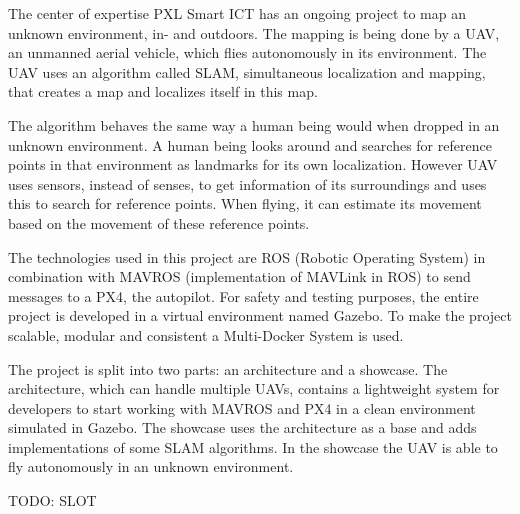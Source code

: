 The center of expertise PXL Smart ICT has an ongoing project to map an unknown environment, in- and outdoors. The mapping is being done by a UAV, an unmanned aerial vehicle, which flies autonomously in its environment. The UAV uses an algorithm called SLAM, simultaneous localization and mapping, that creates a map and localizes itself in this map.

The algorithm behaves the same way a human being would when dropped in an unknown environment. A human being looks around and searches for reference points in that environment as landmarks for its own localization. However UAV uses sensors, instead of senses, to get information of its surroundings and uses this to search for reference points. When flying, it can estimate its movement based on the movement of these reference points.

The technologies used in this project are ROS (Robotic Operating System) in combination with MAVROS (implementation of MAVLink in ROS) to send messages to a PX4, the autopilot. For safety and testing purposes, the entire project is developed in a virtual environment named Gazebo. To make the project scalable, modular and consistent a Multi-Docker System is used.

The project is split into two parts: an architecture and a showcase. The architecture, which can handle multiple UAVs, contains a lightweight system for developers to start working with MAVROS and PX4 in a clean environment simulated in Gazebo. The showcase uses the architecture as a base and adds implementations of some SLAM algorithms. In the showcase the UAV is able to fly autonomously in an unknown environment.

TODO: SLOT